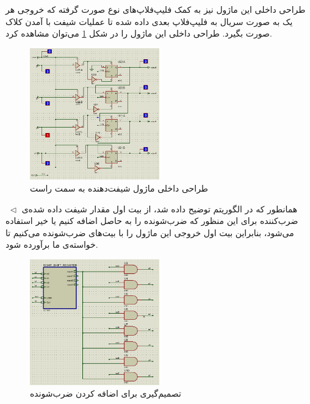 \documentclass[12pt,onecolumn,a4paper,fleqn]{article}
\begin{document}
	طراحی داخلی این ماژول نیز به کمک فلیپ‌فلاپ‌های نوع  صورت گرفته که خروجی هر یک به صورت سریال به فلیپ‌فلاپ بعدی داده شده تا عملیات شیفت با آمدن کلاک صورت بگیرد. طراحی داخلی این ماژول را در شکل \ref{fig:rshift_inner} می‌توان مشاهده کرد.
	\begin{figure}[H]
		\centering
		\includegraphics[width=0.5\textwidth]{source/rshift_inner.png}
		\caption{طراحی داخلی ماژول شیفت‌دهنده به سمت راست}
		\label{fig:rshift_inner}
	\end{figure}
	\noindent
	$\;\triangleleft$
	همانطور که در الگوریتم  توضیح داده شد، از بیت اول مقدار شیفت داده شده‌ی ضرب‌کننده برای این منظور که ضرب‌شونده را به حاصل اضافه کنیم یا خیر استفاده می‌شود، بنابراین بیت اول خروجی این ماژول را با بیت‌های ضرب‌شونده  می‌کنیم تا خواسته‌ی ما برآورده شود.
	\begin{figure}[H]
		\centering
		\includegraphics[width=0.5\textwidth]{source/decidetoadd.png}
		\caption{تصمیم‌گیری برای اضافه کردن ضرب‌شونده}
		\label{fig:decidetoadd}
	\end{figure}
\end{document}
